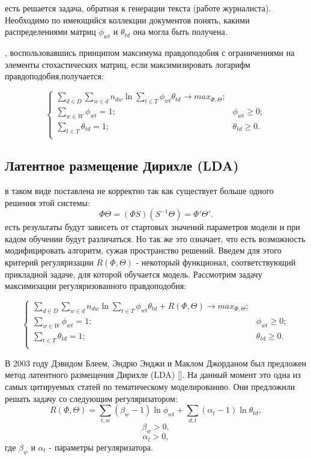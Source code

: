  есть решается задача, обратная к генерации текста (работе журналиста). Необходимо по имеющийся коллекции документов понять, какими распределениями матриц $\phi_{wt}$ и $\theta_{td}$ она могла быть получена.


, воспользовавшись принципом максимума правдоподобия с ограничениями на элементы стохастических матриц, если максимизировать  логарифм правдоподобия,получается:

$$ 
\begin{cases}
    \sum_{d \in D} \sum_{w \in d} n_{dw} \ln{\sum_{t \in T} \phi_{wt} \theta_{td} } \rightarrow max_{\Phi,\Theta};\\
    \sum_{w \in W}\phi_{wt} = 1; &\phi_{wt} \ge 0;\\
    \sum_{t \in T}\theta_{td} = 1; &\theta_{td} \ge 0.\\
\end{cases}
$$

\subsection{Латентное размещение Дирихле (LDA)}

 в таком виде поставлена не корректно так как существует больше одного решения этой системы:
$$
\Phi\Theta = (\Phi S)(S^{-1}\Theta)=\Phi'\Theta'.
$$
 есть результаты будут зависеть от стартовых значений параметров модели и при кадом обучении будут различаться. Но так же это означает, что есть возможность модифицировать алгоритм, сужая пространство решений. Введем для этого критерий регуляризации $R(\Phi,\Theta)$ - некоторый функционал, соответствующий прикладной задаче, для которой обучается модель. Рассмотрим задачу максимизации регуляризованного правдоподобия:

$$ 
\begin{cases}
    \sum_{d \in D} \sum_{w \in d} n_{dw} \ln{\sum_{t \in T} \phi_{wt} \theta_{td} } + R(\Phi,\Theta) \rightarrow max_{\Phi,\Theta};\\
    \sum_{w \in W}\phi_{wt} = 1; &\phi_{wt} \ge 0;\\
    \sum_{t \in T}\theta_{td} = 1; &\theta_{td} \ge 0.\\
\end{cases}
$$

В 2003 году Дэвидом Блеем, Эндрю Энджи и Маклом Джорданом был предложен метод латентного размещения Дирихле (LDA) [\todo{}]. На данный момент это одна из самых цитируемых статей по тематическому моделированию. Они предложили решать задачу со следующим регуляризатором:
$$
R(\Phi,\Theta) = \sum_{t,w}{(\beta_w-1)\ln{\phi_{wt}}} + \sum_{d,t}{(\alpha_t-1)\ln{\theta_{td}}},
$$
$$
\beta_w > 0, 
$$
$$
\alpha_t > 0,
$$
где $\beta_w$ и $\alpha_t$ - параметры регуляризатора.

